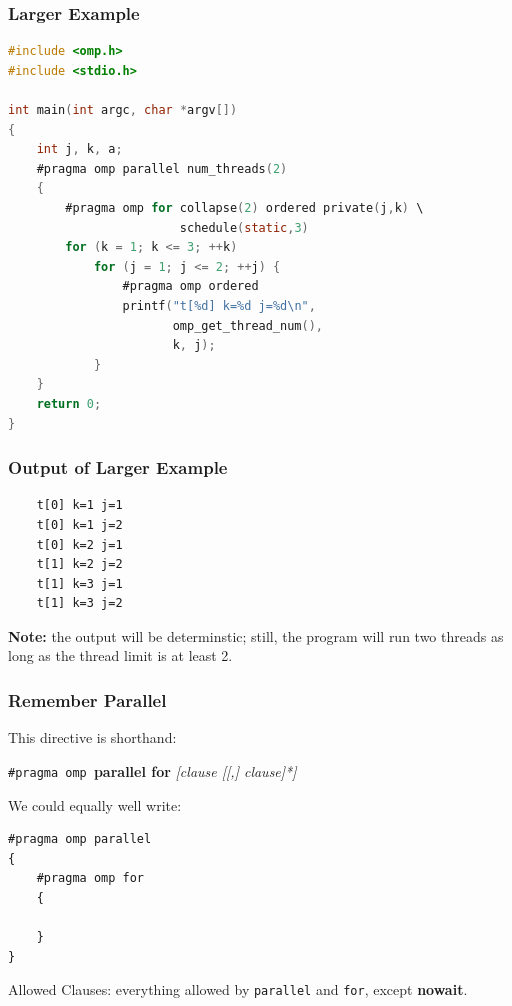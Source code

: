\begin{frame}[fragile]
\frametitle{Larger Example}

  \begin{lstlisting}[language=C]
#include <omp.h>
#include <stdio.h>

int main(int argc, char *argv[])
{
    int j, k, a;
    #pragma omp parallel num_threads(2)
    {
        #pragma omp for collapse(2) ordered private(j,k) \
                        schedule(static,3)
        for (k = 1; k <= 3; ++k)
            for (j = 1; j <= 2; ++j) {
                #pragma omp ordered
                printf("t[%d] k=%d j=%d\n",
                       omp_get_thread_num(),
                       k, j);
            }
    }
    return 0;
}
  \end{lstlisting}

\end{frame}

\begin{frame}[fragile]
\frametitle{Output of Larger Example}

\begin{lstlisting}
    t[0] k=1 j=1
    t[0] k=1 j=2
    t[0] k=2 j=1
    t[1] k=2 j=2
    t[1] k=3 j=1
    t[1] k=3 j=2
  \end{lstlisting}

{\bf Note:} the output will be determinstic; still, the program will run two threads as long as the thread limit is at least 2.


\end{frame}


\begin{frame}[fragile]
\frametitle{Remember Parallel}

This directive is shorthand:

  \begin{center}
    {\tt \#pragma omp }{\bf parallel for} {\it [clause [[,] clause]*]}
  \end{center}

We could equally well write:

  \begin{lstlisting}
#pragma omp parallel
{
    #pragma omp for
    {

    }
}
  \end{lstlisting}


Allowed Clauses: everything allowed by {\tt parallel} and {\tt for}, except
  {\bf nowait}.



\end{frame}


